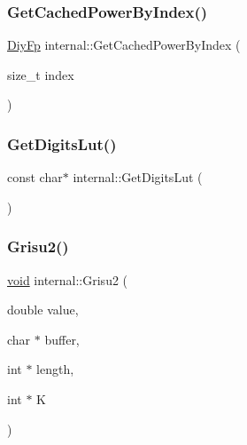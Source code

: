 \mbox{\label{namespaceinternal_a3e95f043ed6c40cda1c1bc33c2f0ece2}} 
\subsubsection{\texorpdfstring{Get\+Cached\+Power\+By\+Index()}{GetCachedPowerByIndex()}}
{\footnotesize\ttfamily \hyperlink{structinternal_1_1DiyFp}{Diy\+Fp} internal\+::\+Get\+Cached\+Power\+By\+Index (\begin{DoxyParamCaption}\item[{size\+\_\+t}]{index }\end{DoxyParamCaption})\hspace{0.3cm}{\ttfamily [inline]}}

\mbox{\label{namespaceinternal_a95459e80b3f0e89ad03ebd0c8e55844c}} 
\subsubsection{\texorpdfstring{Get\+Digits\+Lut()}{GetDigitsLut()}}
{\footnotesize\ttfamily const char$\ast$ internal\+::\+Get\+Digits\+Lut (\begin{DoxyParamCaption}{ }\end{DoxyParamCaption})\hspace{0.3cm}{\ttfamily [inline]}}

\mbox{\label{namespaceinternal_aeb7b6c0784b644968003cbd1b9da57e3}} 
\subsubsection{\texorpdfstring{Grisu2()}{Grisu2()}}
{\footnotesize\ttfamily \hyperlink{imgui__impl__opengl3__loader_8h_ac668e7cffd9e2e9cfee428b9b2f34fa7}{void} internal\+::\+Grisu2 (\begin{DoxyParamCaption}\item[{double}]{value,  }\item[{char $\ast$}]{buffer,  }\item[{int $\ast$}]{length,  }\item[{int $\ast$}]{K }\end{DoxyParamCaption})\hspace{0.3cm}{\ttfamily [inline]}}

